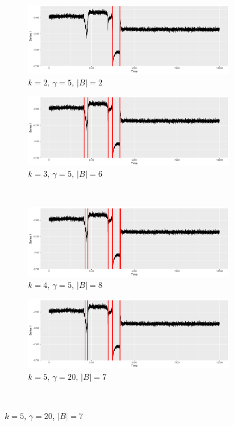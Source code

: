 \begin{figure}[H]
  \centering
  \begin{subfigure}{0.45\textwidth}
    \centering
    \includegraphics[width = \textwidth]{best/best_k_2_gamma_5.pdf}
    \caption{$k = 2 $, $\gamma = 5$, $|B| = 2$}
  \label{fig:best_2}
  \end{subfigure}
 \begin{subfigure}{0.45\textwidth}
    \centering
    \includegraphics[width = \textwidth]{best/best_k_3_gamma_5.pdf}
    \caption{$k = 3 $, $\gamma = 5$, $|B| = 6$}
  \label{fig:best_3}
  \end{subfigure} \\

  \begin{subfigure}{0.45\textwidth}
    \centering
    \includegraphics[width = \textwidth]{best/best_k_4_gamma_5.pdf}
    \caption{$k = 4 $, $\gamma = 5$, $|B| = 8$}
  \label{fig:best_4}
  \end{subfigure}
 \begin{subfigure}{0.45\textwidth}
    \centering
    \includegraphics[width = \textwidth]{best/best_k_5_gamma_20.pdf}
    \caption{$k = 5 $, $\gamma = 20$, $|B| = 7$}
  \label{fig:best_5}
  \end{subfigure} \\


\end{figure}
